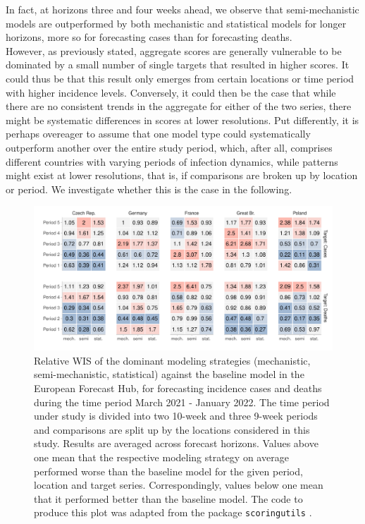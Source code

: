 In fact, at horizons three and four weeks ahead, we observe that semi-mechanistic models are outperformed by both mechanistic and statistical models for longer horizons, more so for forecasting cases than for forecasting deaths.\\ 
However, as previously stated, aggregate scores are generally vulnerable to be dominated by a small number of single targets that resulted in higher scores. It could thus be that this result only emerges from certain locations or time period with higher incidence levels. Conversely, it could then be the case that while there are no consistent trends in the aggregate for either of the two series, there might be systematic differences in scores at lower resolutions. Put differently, it is perhaps overeager to assume that one model type could systematically outperform another over the entire study period, which, after all, comprises different countries with varying periods of infection dynamics, while patterns might exist at lower resolutions, that is, if comparisons are broken up by location or period. We investigate whether this is the case in the following. 
\begin{figure}
\centering
\includegraphics[width = \textwidth]{../plots/pw_comp_model_types_across_periods_and_loc_wide.pdf}
\caption{Relative WIS of the dominant modeling strategies (mechanistic, semi-mechanistic, statistical) against the baseline model in the European Forecast Hub, for forecasting incidence cases and deaths during the time period March 2021 - January 2022. The time period under study is divided into two 10-week and three 9-week periods and comparisons are split up by the locations considered in this study. Results are averaged across forecast horizons. Values above one mean that the respective modeling strategy on average performed worse than the baseline model for the given period, location and target series. Correspondingly, values below one mean that it performed better than the baseline model.  The code to produce this plot was adapted from the package \texttt{scoringutils} \citep{bosse_evaluating_2022}.}
\label{fig:pw_comp_modeltypes_byloc}
\end{figure}\medskip\\ 

